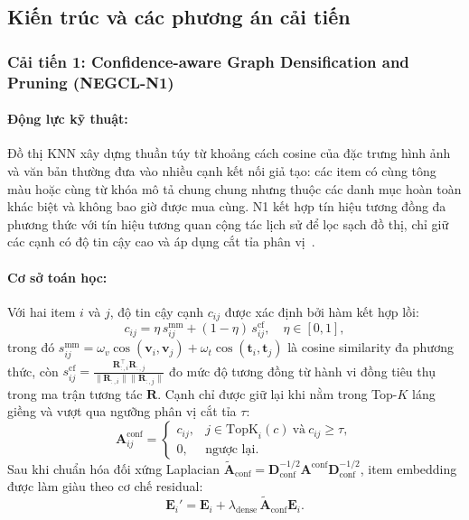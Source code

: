 \subsection{Kiến trúc và các phương án cải tiến}
\label{sec:negcl_methods}

\subsubsection{Cải tiến 1: Confidence-aware Graph Densification and Pruning (NEGCL-N1)}

\paragraph{Động lực kỹ thuật:}
Đồ thị KNN xây dựng thuần túy từ khoảng cách cosine của đặc trưng hình ảnh và văn bản thường đưa vào nhiều cạnh kết nối giả tạo: các item có cùng tông màu hoặc cùng từ khóa mô tả chung chung nhưng thuộc các danh mục hoàn toàn khác biệt và không bao giờ được mua cùng. N1 kết hợp tín hiệu tương đồng đa phương thức với tín hiệu tương quan cộng tác lịch sử để lọc sạch đồ thị, chỉ giữ các cạnh có độ tin cậy cao và áp dụng cắt tỉa phân vị~\cite{qi2025seeing}.

\paragraph{Cơ sở toán học:}
Với hai item $i$ và $j$, độ tin cậy cạnh $c_{ij}$ được xác định bởi hàm kết hợp lồi:
\begin{equation}
c_{ij} = \eta \, s_{ij}^{\text{mm}} + (1 - \eta) \, s_{ij}^{\text{cf}}, \quad \eta \in [0, 1],
\label{eq:n1_conf_score}
\end{equation}
trong đó $s_{ij}^{\text{mm}} = \omega_v \cos(\mathbf{v}_i, \mathbf{v}_j) + \omega_t \cos(\mathbf{t}_i, \mathbf{t}_j)$ là cosine similarity đa phương thức, còn $s_{ij}^{\text{cf}} = \frac{\mathbf{R}_{:,i}^\top \mathbf{R}_{:,j}}{\|\mathbf{R}_{:,i}\| \|\mathbf{R}_{:,j}\|}$ đo mức độ tương đồng từ hành vi đồng tiêu thụ trong ma trận tương tác $\mathbf{R}$. Cạnh chỉ được giữ lại khi nằm trong Top-$K$ láng giềng và vượt qua ngưỡng phân vị cắt tỉa $\tau$:
\begin{equation}
\mathbf{A}_{ij}^{\text{conf}} = 
\begin{cases}
c_{ij}, & j \in \text{TopK}_i(c) \ \text{và} \ c_{ij} \ge \tau, \\
0, & \text{ngược lại.}
\end{cases}
\label{eq:n1_pruning}
\end{equation}
Sau khi chuẩn hóa đối xứng Laplacian $\tilde{\mathbf{A}}_{\text{conf}} = \mathbf{D}_{\text{conf}}^{-1/2} \mathbf{A}^{\text{conf}} \mathbf{D}_{\text{conf}}^{-1/2}$, item embedding được làm giàu theo cơ chế residual:
\begin{equation}
\mathbf{E}_i' = \mathbf{E}_i + \lambda_{\text{dense}} \, \tilde{\mathbf{A}}_{\text{conf}} \mathbf{E}_i.
\label{eq:n1_residual}
\end{equation}


